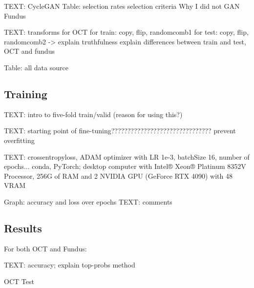 \documentclass{article}
\begin{document}
			TEXT: CycleGAN
				Table: selection rates
				selection criteria
				Why I did not GAN Fundus
				
			TEXT: transforms for OCT
				for train: copy, flip, randomcomb1
				for test: copy, flip, randomcomb2 -> explain truthfulness
				explain differences between train and test, OCT and fundus

			Table: all data source
			
		\subsection{Training}
			
			TEXT: intro to five-fold train/valid (reason for using this?)
			
			TEXT: starting point of fine-tuning???????????????????????????????
			prevent overfitting
			
			TEXT: crossentropyloss, ADAM optimizer with LR 1e-3, batchSize 16, number of epochs...
			conda, PyTorch;
			desktop computer with Intel® Xeon® Platinum 8352V Processor, 256G of RAM and 2 NVIDIA GPU (GeForce RTX 4090) with 48 VRAM
			
			Graph: accuracy and loss over epochs
			TEXT: comments
			
		\subsection{Results}
			
			For both OCT and Fundus:
			
				TEXT: accuracy; explain top-probs method
				
				
				
				\begin{table}[htbp]
					\centering
					\caption{OCT Test}
					\label{tb:OCT_test}
				\end{table}
				
\end{document}

